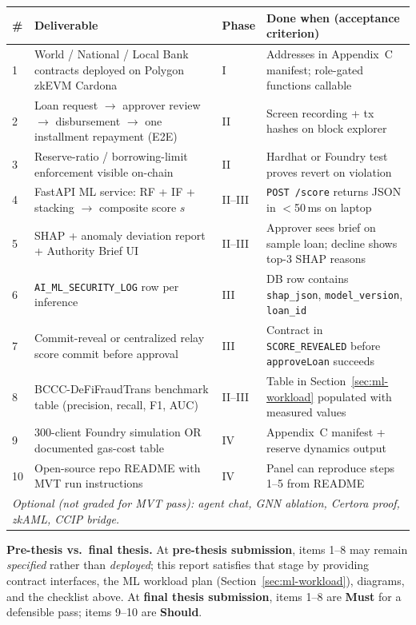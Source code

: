 \documentclass[12pt,a4paper]{report}
\newcommand{\tableheadcolor}{\rowcolor{TableHeadBg}}
\begin{document}
\begin{table}[H]
\centering
\begin{tabular}{p{0.5cm}p{4.8cm}p{1.6cm}p{6.3cm}}
\toprule
\tableheadcolor
\textbf{\#} & \textbf{Deliverable} & \textbf{Phase} & \textbf{Done when (acceptance criterion)} \\
\midrule
1 & World / National / Local Bank contracts deployed on Polygon zkEVM Cardona & I & Addresses in Appendix~C manifest; role-gated functions callable \\
2 & Loan request $\to$ approver review $\to$ disbursement $\to$ one installment repayment (E2E) & II & Screen recording + tx hashes on block explorer \\
3 & Reserve-ratio / borrowing-limit enforcement visible on-chain & II & Hardhat or Foundry test proves revert on violation \\
4 & FastAPI ML service: RF + IF + stacking $\to$ composite score $s$ & II--III & \texttt{POST /score} returns JSON in $<$50\,ms on laptop \\
5 & SHAP + anomaly deviation report + Authority Brief UI & II--III & Approver sees brief on sample loan; decline shows top-3 SHAP reasons \\
6 & \texttt{AI\_ML\_SECURITY\_LOG} row per inference & III & DB row contains \texttt{shap\_json}, \texttt{model\_version}, \texttt{loan\_id} \\
7 & Commit-reveal or centralized relay score commit before approval & III & Contract in \texttt{SCORE\_REVEALED} before \texttt{approveLoan} succeeds \\
8 & BCCC-DeFiFraudTrans benchmark table (precision, recall, F1, AUC) & II--III & Table in Section~\ref{sec:ml-workload} populated with measured values \\
9 & 300-client Foundry simulation OR documented gas-cost table & IV & Appendix~C manifest + reserve dynamics output \\
10 & Open-source repo README with MVT run instructions & IV & Panel can reproduce steps 1--5 from README \\
\multicolumn{4}{l}{\textit{Optional (not graded for MVT pass): agent chat, GNN ablation, Certora proof, zkAML, CCIP bridge.}} \\
\bottomrule
\end{tabular}
\end{table}

\noindent\textbf{Pre-thesis vs.\ final thesis.} At \textbf{pre-thesis submission}, items 1--8 may remain \textit{specified} rather than \textit{deployed}; this report satisfies that stage by providing contract interfaces, the ML workload plan (Section~\ref{sec:ml-workload}), diagrams, and the checklist above. At \textbf{final thesis submission}, items 1--8 are \textbf{Must} for a defensible pass; items 9--10 are \textbf{Should}.
\end{document}
